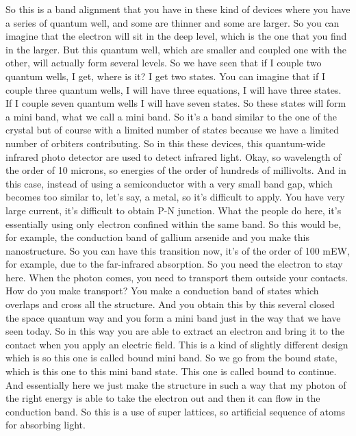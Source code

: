 So this is a band alignment that you have in these kind of devices where you have a series of quantum well, and some are thinner and some are larger. So you can imagine that the electron will sit in the deep level, which is the one that you find in the larger. But this quantum well, which are smaller and coupled one with the other, will actually form several levels. So we have seen that if I couple two quantum wells, I get, where is it? I get two states. You can imagine that if I couple three quantum wells, I will have three equations, I will have three states. If I couple seven quantum wells I will have seven states. So these states will form a mini band, what we call a mini band. So it's a band similar to the one of the crystal but of course with a limited number of states because we have a limited number of orbiters contributing. So in this these devices, this quantum-wide infrared photo detector are used to detect infrared light. Okay, so wavelength of the order of 10 microns, so energies of the order of hundreds of millivolts. And in this case, instead of using a semiconductor with a very small band gap, which becomes too similar to, let's say, a metal, so it's difficult to apply. You have very large current, it's difficult to obtain P-N junction. What the people do here, it's essentially using only electron confined within the same band. So this would be, for example, the conduction band of gallium arsenide and you make this nanostructure. So you can have this transition now, it's of the order of 100 mEW, for example, due to the far-infrared absorption. So you need the electron to stay here. When the photon comes, you need to transport them outside your contacts. How do you make transport? You make a conduction band of states which overlaps and cross all the structure. And you obtain this by this several closed the space quantum way and you form a mini band just in the way that we have seen today. So in this way you are able to extract an electron and bring it to the contact when you apply an electric field. This is a kind of slightly different design which is so this one is called bound mini band. So we go from the bound state, which is this one to this mini band state. This one is called bound to continue. And essentially here we just make the structure in such a way that my photon of the right energy is able to take the electron out and then it can flow in the conduction band. So this is a use of super lattices, so artificial sequence of atoms for absorbing light.\\
